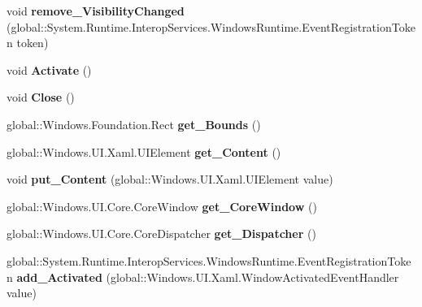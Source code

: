 \begin{DoxyCompactItemize}
void {\bfseries remove\+\_\+\+Visibility\+Changed} (global\+::\+System.\+Runtime.\+Interop\+Services.\+Windows\+Runtime.\+Event\+Registration\+Token token)
\item 
\mbox{\label{interface_windows_1_1_u_i_1_1_xaml_1_1_i_window_abd03eb4d50259c71054881409abc5f8b}} 
void {\bfseries Activate} ()
\item 
\mbox{\label{interface_windows_1_1_u_i_1_1_xaml_1_1_i_window_aab0ec94c2d9d76b4700935c7fcbf6985}} 
void {\bfseries Close} ()
\item 
\mbox{\label{interface_windows_1_1_u_i_1_1_xaml_1_1_i_window_af2863431652d1fabebc1b69ecfd57046}} 
global\+::\+Windows.\+Foundation.\+Rect {\bfseries get\+\_\+\+Bounds} ()
\item 
\mbox{\label{interface_windows_1_1_u_i_1_1_xaml_1_1_i_window_afa1d6f285027cb3cb96ea5f24bfcf835}} 
global\+::\+Windows.\+U\+I.\+Xaml.\+U\+I\+Element {\bfseries get\+\_\+\+Content} ()
\item 
\mbox{\label{interface_windows_1_1_u_i_1_1_xaml_1_1_i_window_a2d901a6fe27bc44318e84499ea7c8f9b}} 
void {\bfseries put\+\_\+\+Content} (global\+::\+Windows.\+U\+I.\+Xaml.\+U\+I\+Element value)
\item 
\mbox{\label{interface_windows_1_1_u_i_1_1_xaml_1_1_i_window_a88fdb6132a02265b78f40881de9331dd}} 
global\+::\+Windows.\+U\+I.\+Core.\+Core\+Window {\bfseries get\+\_\+\+Core\+Window} ()
\item 
\mbox{\label{interface_windows_1_1_u_i_1_1_xaml_1_1_i_window_a500f2f06a9d802fb139e8005d1ece28b}} 
global\+::\+Windows.\+U\+I.\+Core.\+Core\+Dispatcher {\bfseries get\+\_\+\+Dispatcher} ()
\item 
\mbox{\label{interface_windows_1_1_u_i_1_1_xaml_1_1_i_window_ab6f49a1482246a7a6cf23ac64ec3469b}} 
global\+::\+System.\+Runtime.\+Interop\+Services.\+Windows\+Runtime.\+Event\+Registration\+Token {\bfseries add\+\_\+\+Activated} (global\+::\+Windows.\+U\+I.\+Xaml.\+Window\+Activated\+Event\+Handler value)

\end{DoxyCompactItemize}
